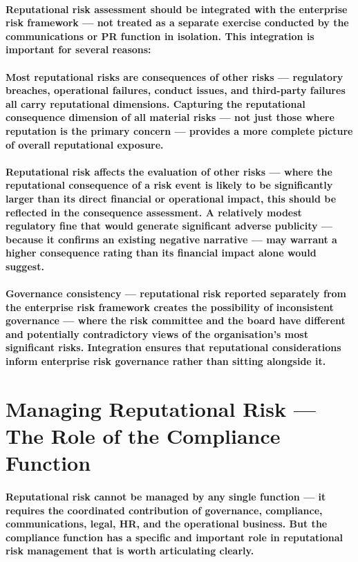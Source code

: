 \paragraph{Reputational risk assessment should be integrated with the enterprise risk framework — not treated as a separate exercise conducted by the communications or PR function in isolation. This integration is important for several reasons:}
\paragraph{\textbf{Most reputational risks are consequences of other risks} — regulatory breaches, operational failures, conduct issues, and third-party failures all carry reputational dimensions. Capturing the reputational consequence dimension of all material risks — not just those where reputation is the primary concern — provides a more complete picture of overall reputational exposure.}
\paragraph{\textbf{Reputational risk affects the evaluation of other risks} — where the reputational consequence of a risk event is likely to be significantly larger than its direct financial or operational impact, this should be reflected in the consequence assessment. A relatively modest regulatory fine that would generate significant adverse publicity — because it confirms an existing negative narrative — may warrant a higher consequence rating than its financial impact alone would suggest.}
\paragraph{\textbf{Governance consistency} — reputational risk reported separately from the enterprise risk framework creates the possibility of inconsistent governance — where the risk committee and the board have different and potentially contradictory views of the organisation's most significant risks. Integration ensures that reputational considerations inform enterprise risk governance rather than sitting alongside it.}

\section{Managing Reputational Risk — The Role of the Compliance Function}
\paragraph{Reputational risk cannot be managed by any single function — it requires the coordinated contribution of governance, compliance, communications, legal, HR, and the operational business. But the compliance function has a specific and important role in reputational risk management that is worth articulating clearly.}

